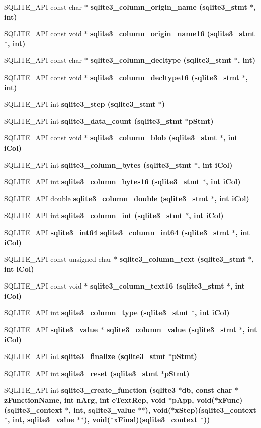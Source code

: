 \begin{CompactItemize}
SQLITE\_\-API const char $\ast$ \bf{sqlite3\_\-column\_\-origin\_\-name} (\bf{sqlite3\_\-stmt} $\ast$, int)
\item 
SQLITE\_\-API const void $\ast$ \bf{sqlite3\_\-column\_\-origin\_\-name16} (\bf{sqlite3\_\-stmt} $\ast$, int)
\item 
SQLITE\_\-API const char $\ast$ \bf{sqlite3\_\-column\_\-decltype} (\bf{sqlite3\_\-stmt} $\ast$, int)
\item 
SQLITE\_\-API const void $\ast$ \bf{sqlite3\_\-column\_\-decltype16} (\bf{sqlite3\_\-stmt} $\ast$, int)
\item 
SQLITE\_\-API int \bf{sqlite3\_\-step} (\bf{sqlite3\_\-stmt} $\ast$)
\item 
SQLITE\_\-API int \bf{sqlite3\_\-data\_\-count} (\bf{sqlite3\_\-stmt} $\ast$p\-Stmt)
\item 
SQLITE\_\-API const void $\ast$ \bf{sqlite3\_\-column\_\-blob} (\bf{sqlite3\_\-stmt} $\ast$, int i\-Col)
\item 
SQLITE\_\-API int \bf{sqlite3\_\-column\_\-bytes} (\bf{sqlite3\_\-stmt} $\ast$, int i\-Col)
\item 
SQLITE\_\-API int \bf{sqlite3\_\-column\_\-bytes16} (\bf{sqlite3\_\-stmt} $\ast$, int i\-Col)
\item 
SQLITE\_\-API double \bf{sqlite3\_\-column\_\-double} (\bf{sqlite3\_\-stmt} $\ast$, int i\-Col)
\item 
SQLITE\_\-API int \bf{sqlite3\_\-column\_\-int} (\bf{sqlite3\_\-stmt} $\ast$, int i\-Col)
\item 
SQLITE\_\-API \bf{sqlite3\_\-int64} \bf{sqlite3\_\-column\_\-int64} (\bf{sqlite3\_\-stmt} $\ast$, int i\-Col)
\item 
SQLITE\_\-API const unsigned char $\ast$ \bf{sqlite3\_\-column\_\-text} (\bf{sqlite3\_\-stmt} $\ast$, int i\-Col)
\item 
SQLITE\_\-API const void $\ast$ \bf{sqlite3\_\-column\_\-text16} (\bf{sqlite3\_\-stmt} $\ast$, int i\-Col)
\item 
SQLITE\_\-API int \bf{sqlite3\_\-column\_\-type} (\bf{sqlite3\_\-stmt} $\ast$, int i\-Col)
\item 
SQLITE\_\-API \bf{sqlite3\_\-value} $\ast$ \bf{sqlite3\_\-column\_\-value} (\bf{sqlite3\_\-stmt} $\ast$, int i\-Col)
\item 
SQLITE\_\-API int \bf{sqlite3\_\-finalize} (\bf{sqlite3\_\-stmt} $\ast$p\-Stmt)
\item 
SQLITE\_\-API int \bf{sqlite3\_\-reset} (\bf{sqlite3\_\-stmt} $\ast$p\-Stmt)
\item 
SQLITE\_\-API int \bf{sqlite3\_\-create\_\-function} (\bf{sqlite3} $\ast$\bf{db}, const char $\ast$z\-Function\-Name, int n\-Arg, int e\-Text\-Rep, void $\ast$p\-App, void($\ast$x\-Func)(\bf{sqlite3\_\-context} $\ast$, int, \bf{sqlite3\_\-value} $\ast$$\ast$), void($\ast$x\-Step)(\bf{sqlite3\_\-context} $\ast$, int, \bf{sqlite3\_\-value} $\ast$$\ast$), void($\ast$x\-Final)(\bf{sqlite3\_\-context} $\ast$))

\end{CompactItemize}

